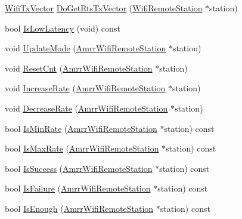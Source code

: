 \begin{DoxyCompactItemize}
\item 
\hyperlink{classns3_1_1WifiTxVector}{Wifi\+Tx\+Vector} \hyperlink{classns3_1_1AmrrWifiManager_a036c453d18e33475b8ad75922682d214}{Do\+Get\+Rts\+Tx\+Vector} (\hyperlink{structns3_1_1WifiRemoteStation}{Wifi\+Remote\+Station} $\ast$station)
\item 
bool \hyperlink{classns3_1_1AmrrWifiManager_a81efd44f32e3f8501b9ccd90f6a146d5}{Is\+Low\+Latency} (void) const 
\item 
void \hyperlink{classns3_1_1AmrrWifiManager_a2bdf0c3696234b2d530d3becd174afdd}{Update\+Mode} (\hyperlink{structns3_1_1AmrrWifiRemoteStation}{Amrr\+Wifi\+Remote\+Station} $\ast$station)
\item 
void \hyperlink{classns3_1_1AmrrWifiManager_a6ffbd010f90fcf7f57f0d370dd7bd9a6}{Reset\+Cnt} (\hyperlink{structns3_1_1AmrrWifiRemoteStation}{Amrr\+Wifi\+Remote\+Station} $\ast$station)
\item 
void \hyperlink{classns3_1_1AmrrWifiManager_ac0a36694c46085127da503d8f907e9fe}{Increase\+Rate} (\hyperlink{structns3_1_1AmrrWifiRemoteStation}{Amrr\+Wifi\+Remote\+Station} $\ast$station)
\item 
void \hyperlink{classns3_1_1AmrrWifiManager_a8b6f4c90ce3f7e9b6f40dae69b1bcb6c}{Decrease\+Rate} (\hyperlink{structns3_1_1AmrrWifiRemoteStation}{Amrr\+Wifi\+Remote\+Station} $\ast$station)
\item 
bool \hyperlink{classns3_1_1AmrrWifiManager_a3b04e945ec1134121023bd783e42b8c8}{Is\+Min\+Rate} (\hyperlink{structns3_1_1AmrrWifiRemoteStation}{Amrr\+Wifi\+Remote\+Station} $\ast$station) const 
\item 
bool \hyperlink{classns3_1_1AmrrWifiManager_a29159adc4ded8234811ee29a3750ccca}{Is\+Max\+Rate} (\hyperlink{structns3_1_1AmrrWifiRemoteStation}{Amrr\+Wifi\+Remote\+Station} $\ast$station) const 
\item 
bool \hyperlink{classns3_1_1AmrrWifiManager_a36375c5d3021ecaa723f98e220574dfc}{Is\+Success} (\hyperlink{structns3_1_1AmrrWifiRemoteStation}{Amrr\+Wifi\+Remote\+Station} $\ast$station) const 
\item 
bool \hyperlink{classns3_1_1AmrrWifiManager_a2eeedee27bdae52ea1df814da844fd7d}{Is\+Failure} (\hyperlink{structns3_1_1AmrrWifiRemoteStation}{Amrr\+Wifi\+Remote\+Station} $\ast$station) const 
\item 
bool \hyperlink{classns3_1_1AmrrWifiManager_a4d6e91edc5acf6552c99a8c9663ef799}{Is\+Enough} (\hyperlink{structns3_1_1AmrrWifiRemoteStation}{Amrr\+Wifi\+Remote\+Station} $\ast$station) const 
\end{DoxyCompactItemize}
